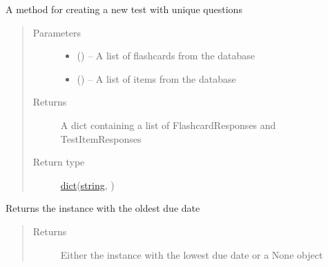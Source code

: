 \documentclass[letterpaper,10pt,english]{sphinxmanual}
\begin{document}
\begin{fulllineitems}
\begin{fulllineitems}
\label{\detokenize{user:user.User.create_test}}
A method for creating a new test with unique questions
\begin{quote}\begin{description}
\item[{Parameters}] \leavevmode\begin{itemize}
\item {} 
 (\href{https://docs.python.org/2/library/functions.html\#list}{}\sphinxstyleliteralemphasis{)}\sphinxstyleliteralemphasis{}) -- A list of flashcards from the database

\item {} 
 (\href{https://docs.python.org/2/library/functions.html\#list}{}\sphinxstyleliteralemphasis{)}\sphinxstyleliteralemphasis{}) -- A list of items from the database

\end{itemize}

\item[{Returns}] \leavevmode
A dict containing a list of FlashcardResponses and TestItemResponses

\item[{Return type}] \leavevmode
\href{https://docs.python.org/2/library/stdtypes.html\#dict}{dict}(\href{https://docs.python.org/2/library/string.html\#module-string}{string}, {\hyperref[\detokenize{response:response.Response}]{}})

\end{description}\end{quote}

\end{fulllineitems}


\begin{fulllineitems}
\label{\detokenize{user:user.User.get_due_instance}}
Returns the instance with the oldest due date
\begin{quote}\begin{description}
\item[{Returns}] \leavevmode
Either the instance with the lowest due date or a None object


\end{description}
\end{quote}
\end{fulllineitems}
\end{fulllineitems}
\end{document}
